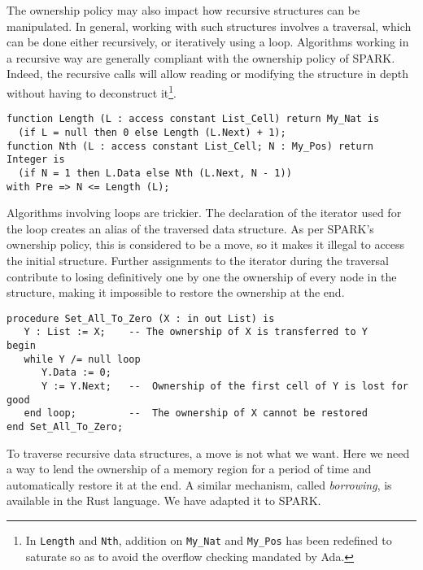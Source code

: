 \documentclass[runningheads]{llncs}
\begin{document}
The ownership policy may also impact how recursive structures can be manipulated. In general, working with such structures involves a traversal, which can be done either recursively, or iteratively using a loop. Algorithms working in a recursive way are generally compliant with the ownership policy of SPARK. Indeed, the recursive calls will allow reading or modifying the structure in depth without having to deconstruct it\footnote{In \texttt{Length} and \texttt{Nth}, addition on \texttt{My\_Nat} and \texttt{My\_Pos} has been redefined to saturate so as to avoid the overflow checking mandated by Ada.}.
\begin{lstlisting}
function Length (L : access constant List_Cell) return My_Nat is
  (if L = null then 0 else Length (L.Next) + 1);
function Nth (L : access constant List_Cell; N : My_Pos) return Integer is
  (if N = 1 then L.Data else Nth (L.Next, N - 1))
with Pre => N <= Length (L);
\end{lstlisting}
Algorithms involving loops are trickier. The declaration of the iterator used for the loop creates an alias of the traversed data structure. As per SPARK's ownership policy, this is considered to be a move, so it makes it illegal to access the initial structure. Further assignments to the iterator during the traversal contribute to losing definitively one by one the ownership of every node in the structure, making it impossible to restore the ownership at the end.
\begin{lstlisting}
procedure Set_All_To_Zero (X : in out List) is
   Y : List := X;    -- The ownership of X is transferred to Y
begin
   while Y /= null loop
      Y.Data := 0;
      Y := Y.Next;   --  Ownership of the first cell of Y is lost for good
   end loop;         --  The ownership of X cannot be restored
end Set_All_To_Zero;
\end{lstlisting}
To traverse recursive data structures, a move is not what we want. Here we need a way to lend the ownership of a memory region for a period of time and automatically restore it at the end. A similar mechanism, called \emph{borrowing}, is available in the Rust language. We have adapted it to SPARK.
\end{document}
